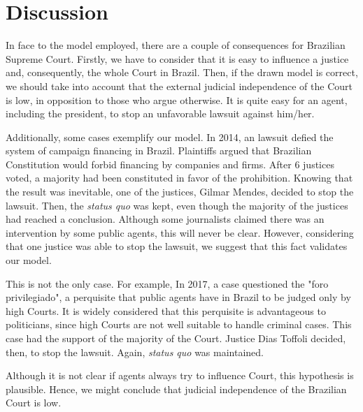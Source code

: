 \documentclass[12pt, a4paper]{article}
\begin{document}

 

\section{Discussion}

In face to the model employed, there are a couple of consequences for Brazilian Supreme Court. Firstly, we have to consider that it is easy to influence a justice and, consequently, the whole Court in Brazil. Then, if the drawn model is correct, we should take into account that the external judicial independence of the Court is low, in opposition to those who argue otherwise. It is quite easy for an agent, including the president, to stop an unfavorable lawsuit against him/her.

Additionally, some cases exemplify our model. In 2014, an lawsuit defied the system of campaign financing in Brazil. Plaintiffs argued that Brazilian Constitution would forbid financing by companies and firms. After 6 justices voted, a majority had been constituted in favor of the prohibition. Knowing that the result was inevitable, one of the justices, Gilmar Mendes, decided to stop the lawsuit. Then, the \textit{status quo} was kept, even though the majority of the justices had reached a conclusion. Although some journalists claimed there was an intervention by some public agents, this will never be clear. However, considering that one justice was able to stop the lawsuit, we suggest that this fact validates our model.

This is not the only case. For example, In 2017, a case questioned the "foro privilegiado", a perquisite that public agents have in Brazil to be judged only by high Courts. It is widely considered that this perquisite is advantageous to politicians, since high Courts are not well suitable to handle criminal cases. This case had the support of the majority of the Court. Justice Dias Toffoli decided, then, to stop the lawsuit. Again, \textit{status quo} was maintained. 

Although it is not clear if agents always try to influence Court, this hypothesis is plausible. Hence, we might conclude that judicial independence of the Brazilian Court is low. 





\end{document}
